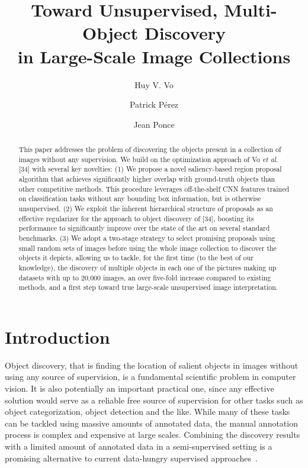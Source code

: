 \documentclass[runningheads]{llncs}
\begin{document}
\pagestyle{headings}
\mainmatter
\def\ECCVSubNumber{XXXX}  

\title{Toward Unsupervised, Multi-Object Discovery\\in Large-Scale Image Collections}
\author{Huy V. Vo \and Patrick P{\'e}rez  \and Jean Ponce }
\maketitle

\begin{abstract}
This paper addresses the problem of discovering the objects present in a collection of images without any supervision. We build on the optimization approach of Vo {\em et al.} [34] with several key novelties: (1) We propose a novel saliency-based region proposal algorithm that achieves significantly higher overlap with ground-truth objects than other competitive methods. This procedure leverages off-the-shelf CNN features trained on classification tasks without any bounding box information, but is otherwise unsupervised. (2) We exploit the inherent hierarchical structure of proposals as an effective regularizer for the approach to object  discovery of [34], boosting its performance to significantly improve over the state of the art on several standard benchmarks. (3) We adopt a two-stage strategy to select promising proposals using small random sets of images before using the whole image collection to discover the objects it depicts, allowing us to tackle, for the first time (to the best of our knowledge), the discovery of multiple objects in each one of the pictures making up datasets with up to 20,000 images, an over five-fold increase compared to existing methods, and a first step toward true large-scale unsupervised image interpretation. 
\end{abstract}

\section{Introduction}
Object discovery, that is finding the location of salient objects in images without using any source of supervision, is a fundamental scientific problem in computer vision. It is also potentially an important practical one, since any effective solution would serve as a reliable free source of supervision for other tasks such as object categorization, object detection and the like. While many of these tasks can be tackled using massive amounts of annotated data, the manual annotation process is complex and expensive at large scales. Combining the discovery results with a limited amount of annotated data in a semi-supervised setting is a promising alternative to current data-hungry supervised approaches~\cite{Wei2019ddtplus}.
\end{document}
